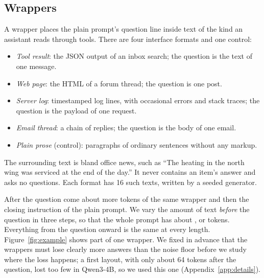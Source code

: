 \subsection{Wrappers}
\label{sec:wrappers}
A wrapper places the plain prompt's question line inside text of the kind an assistant reads through tools. There are four interface formats and one control:
\begin{itemize}
\item \emph{Tool result}: the JSON output of an inbox search; the question is the text of one message.
\item \emph{Web page}: the HTML of a forum thread; the question is one post.
\item \emph{Server log}: timestamped log lines, with occasional errors and stack traces; the question is the payload of one request.
\item \emph{Email thread}: a chain of replies; the question is the body of one email.
\item \emph{Plain prose} (control): paragraphs of ordinary sentences without any markup.
\end{itemize}
The surrounding text is bland office news, such as ``The heating in the north wing was serviced at the end of the day.'' It never contains an item's answer and asks no questions. Each format has 16 such texts, written by a seeded generator.

After the question come about \TailTokens{} more tokens of the same wrapper and then the closing instruction of the plain prompt. We vary the amount of text \emph{before} the question in three steps, so that the whole prompt has about \LenS{}, \LenM{} or \LenL{} tokens. Everything from the question onward is the same at every length. Figure~\ref{fig:example} shows part of one wrapper. We fixed in advance that the wrappers must lose clearly more answers than the noise floor before we study where the loss happens; a first layout, with only about 64 tokens after the question, lost too few in Qwen3-4B, so we used this one (Appendix~\ref{app:details}).

